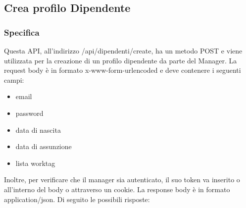 \documentclass{report}
\begin{document}
\subsection{Crea profilo Dipendente}

\subsubsection*{Specifica}
Questa API, all'indirizzo /api/dipendenti/create, ha un metodo POST e viene utilizzata per la creazione di un profilo dipendente da parte del Manager.
La request body è in formato x-www-form-urlencoded e deve contenere i seguenti campi:
\begin{itemize}

	\item email
	\item password
	\item data di nascita
	\item data di assunzione
	\item lista worktag
\end{itemize}
Inoltre, per verificare che il manager sia autenticato, il suo token va inserito o all'interno del body o attraverso un cookie.
La response body è in formato application/json. Di seguito le possibili risposte:
\end{document}
